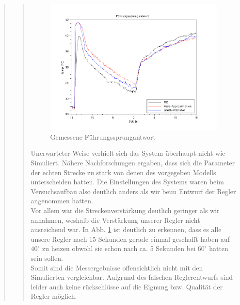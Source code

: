 \begin{quote}
\begin{quote}
        \begin{figure}[H]
            \centering
            \includegraphics[scale=1, trim = 1cm 0.5cm 1cm 1cm, clip]{Bilder/5}
            \caption{Gemessene Führungssprungantwort}
            \label{fig:5}
        \end{figure}
        \vspace{1em}
        
        Unerwarteter Weise verhielt sich das System überhaupt nicht wie Simuliert. Nähere Nachforschungen ergaben, dass
        sich die Parameter der echten Strecke zu stark von denen des vorgegeben Modells unterscheiden hatten. Die
        Einstellungen des Systems waren beim Versuchsaufbau also deutlich anders als wir beim Entwurf der Regler
        angenommen hatten.\\
        Vor allem war die Streckenverstärkung deutlich geringer als wir annahmen, weshalb die Verstärkung
        unserer Regler nicht ausreichend war. In Abb. \ref{fig:5} ist deutlich zu erkennen, dass es alle
        unsere Regler nach 15 Sekunden gerade einmal geschafft haben auf $40^{\circ}$ zu heizen obwohl sie schon nach
        ca. 5 Sekunden bei $60^{\circ}$ hätten sein sollen.\\
        Somit sind die Messergebnisse offensichtlich nicht mit den Simulierten vergleichbar. Aufgrund des falschen
        Reglerentwurfs sind leider auch keine rückschlüsse auf die Eignung bzw. Qualität der Regler möglich.
        
        
        
        
    \end{quote}
    
    
    
    
\end{quote}

